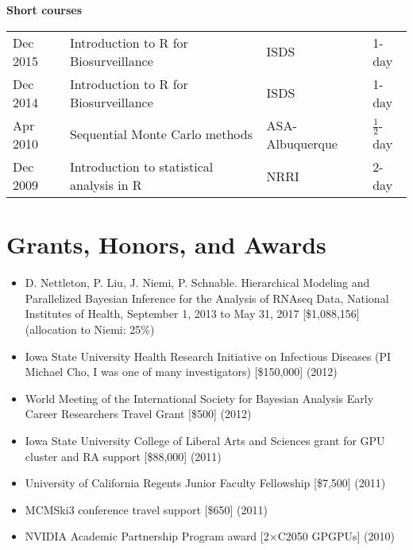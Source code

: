 \documentclass[overlapped,line]{res}
\newcommand{\sinceappt}{}
\begin{document}
\begin{resume}
{\bf Short courses}

\begin{tabular}{llll}
Dec 2015 & Introduction to R for Biosurveillance & ISDS & 1-day \\
Dec 2014 & Introduction to R for Biosurveillance & ISDS & 1-day \\
Apr 2010 & Sequential Monte Carlo methods & ASA-Albuquerque & $\frac{1}{2}$-day \\
Dec 2009 & Introduction to statistical analysis in R & NRRI & 2-day
\end{tabular}



\section{\bf Grants, Honors, and Awards}

\begin{itemize}
\item D. Nettleton, P. Liu, J. Niemi, P. Schnable. Hierarchical Modeling and Parallelized Bayesian Inference for the Analysis of RNAseq Data, National Institutes of Health, September 1, 2013 to May 31, 2017 [\$1,088,156] (allocation to Niemi: 25\%)

\item Iowa State University Health Research Initiative on Infectious Diseases (PI Michael Cho, I was one of many investigators) [\$150,000] (2012)
\item World Meeting of the International Society for Bayesian Analysis Early Career Researchers Travel Grant [\$500] (2012)
\item Iowa State University College of Liberal Arts and Sciences grant for GPU cluster and RA support [\$88,000] (2011)

\sinceappt

\item University of California Regents Junior Faculty Fellowship [\$7,500] (2011)
\item MCMSki3 conference travel support [\$650] (2011)
\item NVIDIA Academic Partnership Program award [2$\times$C2050 GPGPUs] (2010)




\end{itemize}
\end{resume}
\end{document}
